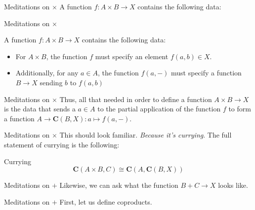 \documentclass[tikz]{beamer}
\theoremstyle{definition}
\begin{document}
\begin{frame}{Meditations on $\times$}
    A function $f: A \times B \to X$ contains the following data: 
\end{frame}{}

\begin{frame}{Meditations on $\times$}

    A function $f: A \times B \to X$ contains the following data: 
    \begin{block}{}
    
        \begin{itemize}
            \item For $A \times B$, the function $f$ must specify an element $f(a,b) \in X$.
            
            \item Additionally, for any $a \in A$, the function $f(a,-)$ must specify a function $B \to X$ sending $b$ to $f(a,b)$
        \end{itemize}{}
    \end{block}{}
\end{frame}{}

\begin{frame}{Meditations on $\times$}
    Thus, all that needed in order to define a function $A \times B \to X$ is the data that sends a $a \in A$ to the partial application of the function $f$ to form a function $A \to \mathbf{C}(B, X): a \mapsto f(a,-)$. 
\end{frame}{}

\begin{frame}{Meditations on $\times$}
    This should look familiar. \textit{Because it's currying}. The full statement of currying is the following:
    
\begin{block}{Currying}
\begin{equation*}
    \mathbf{C}(A \times B, C) \cong \mathbf{C}(A, \mathbf{C}(B, X))
\end{equation*}{}
\end{block}{}
    
\end{frame}{}

\begin{frame}{Meditations on $+$}
    Likewise, we can ask what the function $B + C \to X$ looks like. 
\end{frame}{}

\begin{frame}{Meditations on $+$}
    First, let us define coproducts. 
\end{frame}{}
\end{document}
